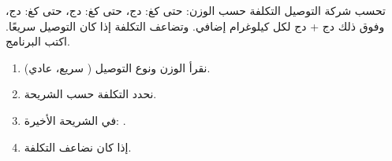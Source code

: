 \begin{statement}
تحسب شركة التوصيل التكلفة حسب الوزن: حتى  كغ:  دج، حتى  كغ:  دج، حتى  كغ:  دج، وفوق ذلك  دج +  دج لكل كيلوغرام إضافي. وتضاعف التكلفة إذا كان التوصيل سريعًا. اكتب البرنامج.
\end{statement}
\begin{stepsbox}\begin{enumerate}
\item نقرأ الوزن  ونوع التوصيل  ( سريع،  عادي).
\item نحدد التكلفة حسب الشريحة.
\item في الشريحة الأخيرة: .
\item إذا كان  نضاعف التكلفة.
\end{enumerate}\end{stepsbox}
